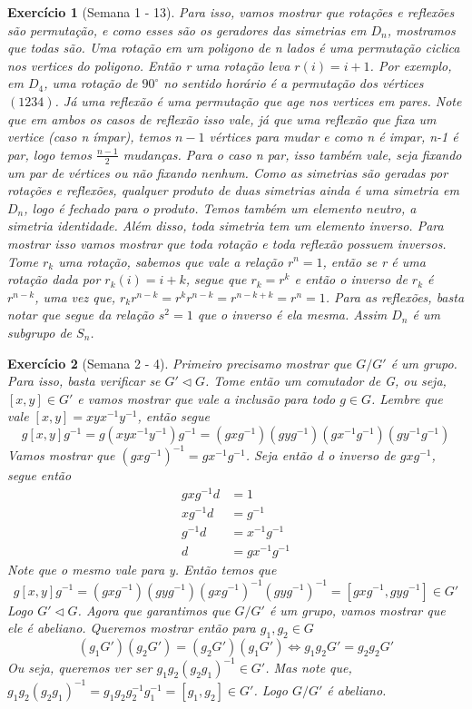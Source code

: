 \documentclass{article}
\newtheorem*{ex}{Exercício}
\begin{document}
\begin{ex}[Semana 1 - 13]
    Para isso, vamos mostrar que rotações e reflexões são permutação, e como esses são os geradores das simetrias 
    em $D_n$, mostramos que todas são.
    Uma rotação em um poligono de n lados é uma permutação ciclica nos vertices do poligono. 
    Então r uma rotação leva $r(i)=i+1$. Por exemplo, em $D_4$, uma rotação 
    de $90^{\circ}$ no sentido horário é a permutação dos vértices $(1234)$.
    Já uma reflexão é uma permutação que age nos vertices em pares. Note 
    que em ambos os casos de reflexão isso vale, já que uma reflexão que fixa
    um vertice (caso n ímpar), temos $n-1$ vértices para mudar e como n é impar, n-1 é par, logo temos $\frac{n-1}{2}$ mudanças.
    Para o caso n par, isso também vale, seja fixando um par de vértices ou não fixando nenhum.
    Como as simetrias são geradas por rotações e reflexões, qualquer produto de duas simetrias ainda é uma simetria em $D_n$, logo é fechado para o produto.
    Temos também um elemento neutro, a simetria identidade.
    Além disso, toda simetria tem um elemento inverso. Para mostrar isso vamos mostrar que toda rotação e toda reflexão possuem inversos.
    Tome $r_k$ uma rotação, sabemos que vale a relação $r^n=1$, então se r é uma rotação dada por
    $r_k(i)=i+k$, segue que $r_k = r^k$ e então o inverso de $r_k$ é $r^{n-k}$, 
    uma vez que, $r_kr^{n-k}=r^kr^{n-k}=r^{n-k+k}=r^n=1$. Para as reflexões, basta notar que
    segue da relação $s^2=1$ que o inverso é ela mesma.
    Assim $D_n$ é um subgrupo de $S_n$.
\end{ex}

\begin{ex}[Semana 2 - 4]
    Primeiro precisamo mostrar que $G/G'$ é um grupo. 
    Para isso, basta verificar se $G' \vartriangleleft G$.
    Tome então um comutador de G, ou seja, $[x, y] \in G'$ e vamos mostrar que vale a inclusão para todo $g \in G$.
    Lembre que vale $[x, y]= xyx^{-1}y^{-1}$, então segue
    \[g[x,y]g^{-1}=g(xyx^{-1}y^{-1})g^{-1}=(gxg^{-1})(gyg^{-1})(gx^{-1}g^{-1})(gy^{-1}g^{-1})\]
    Vamos mostrar que $(gxg^{-1})^{-1}=gx^{-1}g^{-1}$. Seja então d o inverso de $gxg^{-1}$, segue então
    \begin{align*}
        gxg^{-1}d &= 1 \\
        xg^{-1}d &= g^{-1} \\
        g^{-1}d &= x^{-1}g^{-1} \\
        d &= gx^{-1}g^{-1}
    \end{align*}
    Note que o mesmo vale para y.
    Então temos que 
    \[g[x,y]g^{-1} = (gxg^{-1})(gyg^{-1})(gxg^{-1})^{-1}(gyg^{-1})^{-1}=[gxg^{-1}, gyg^{-1}] \in G'\]
    Logo $G' \vartriangleleft G$.
    Agora que garantimos que $G/G'$ é um grupo, vamos mostrar que ele é abeliano. 
    Queremos mostrar então para $g_1, g_2 \in G$
    \[(g_1G')(g_2G') = (g_2G')(g_1G') \Leftrightarrow g_1g_2G'=g_2g_2G'\]
    Ou seja, queremos ver ser $g_1g_2(g_2g_1)^{-1} \in G'$. 
    Mas note que, $g_1g_2(g_2g_1)^{-1} = g_1g_2g_2^{-1}g_1^{-1} = [g_1, g_2] \in G'$.
    Logo $G/G'$ é abeliano.
\end{ex}
\end{document}
